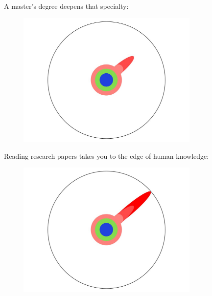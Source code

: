\documentclass[10pt]{beamer}
\begin{document}
\begin{frame}{}
  A master's degree deepens that specialty:
  \begin{figure}[hb]
    \centering
    \includegraphics[width=0.8\textwidth]{images/PhDKnowledge-005.png}
  \end{figure}
\end{frame}



\begin{frame}{}
  Reading research papers takes you to the edge of human knowledge:
  \begin{figure}[hb]
    \centering
    \includegraphics[width=0.8\textwidth]{images/PhDKnowledge-006.png}
  \end{figure}
\end{frame}
\end{document}
